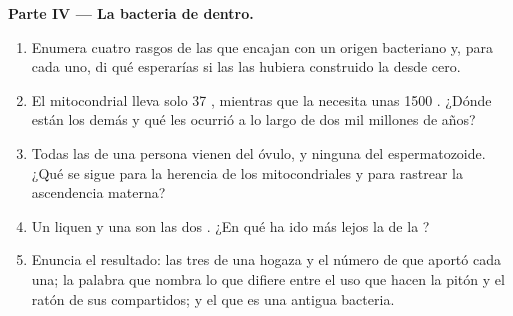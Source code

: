 \begin{problem}
\medskip
\noindent\textbf{Parte IV --- La bacteria de dentro.}
\begin{enumerate}[resume]
  \item Enumera cuatro rasgos de las  que encajan con un
        origen bacteriano y, para cada uno, di qué esperarías si las
         las hubiera construido la  desde cero.
  \item El  mitocondrial lleva solo 37 , mientras que la
         necesita unas 1500 . ¿Dónde están los
        demás  y qué les ocurrió a lo largo de dos mil millones de
        años?
  \item Todas las  de una persona vienen del óvulo, y
        ninguna del espermatozoide. ¿Qué se sigue para la herencia de
        los  mitocondriales y para rastrear la ascendencia
        materna?
  \item Un liquen y una  son las dos . ¿En qué ha
        ido más lejos la de la ?
  \item Enuncia el resultado: las tres  de una hogaza y el
        número de  que aportó cada una; la palabra que nombra
        lo que difiere entre el uso que hacen la pitón y el ratón de
        sus  compartidos; y el  que es una antigua
        bacteria.
\end{enumerate}
\end{problem}
